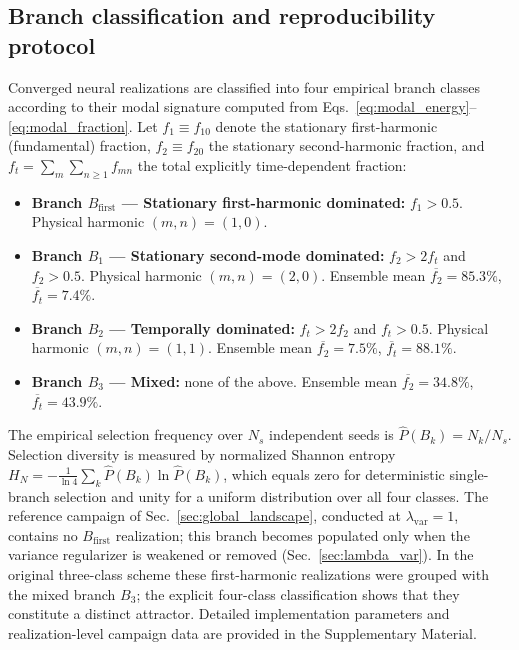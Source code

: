 \documentclass[a4paper,11pt]{article}
\begin{document}
\subsection{Branch classification and reproducibility protocol}

Converged neural realizations are classified into four empirical branch classes
according to their modal signature computed from
Eqs.~\eqref{eq:modal_energy}--\eqref{eq:modal_fraction}. Let
\(f_1\equiv f_{10}\) denote the stationary first-harmonic (fundamental) fraction,
\(f_2\equiv f_{20}\) the stationary second-harmonic fraction, and
\(f_t=\sum_m\sum_{n\ge1}f_{mn}\) the total explicitly time-dependent fraction:
\begin{itemize}
\item \textbf{Branch \(B_{\mathrm{first}}\) --- Stationary first-harmonic dominated:}
\(f_1>0.5\). Physical harmonic \((m,n)=(1,0)\).
\item \textbf{Branch \(B_1\) --- Stationary second-mode dominated:}
\(f_2>2f_t\) and \(f_2>0.5\).
Physical harmonic \((m,n)=(2,0)\). Ensemble mean \(\overline{f_2}=85.3\%\),
\(\overline{f_t}=7.4\%\).
\item \textbf{Branch \(B_2\) --- Temporally dominated:} \(f_t>2f_2\) and \(f_t>0.5\).
Physical harmonic \((m,n)=(1,1)\). Ensemble mean \(\overline{f_2}=7.5\%\),
\(\overline{f_t}=88.1\%\).
\item \textbf{Branch \(B_3\) --- Mixed:} none of the above.
Ensemble mean \(\overline{f_2}=34.8\%\), \(\overline{f_t}=43.9\%\).
\end{itemize}
The empirical selection frequency over \(N_s\) independent seeds is
\(\widehat P(B_k)=N_k/N_s\). Selection diversity is measured by normalized Shannon
entropy \(H_N=-\frac{1}{\ln 4}\sum_k\widehat P(B_k)\ln\widehat P(B_k)\), which
equals zero for deterministic single-branch selection and unity for a uniform
distribution over all four classes. The reference campaign of
Sec.~\ref{sec:global_landscape}, conducted at \(\lambda_{\mathrm{var}}=1\), contains
no \(B_{\mathrm{first}}\) realization; this branch becomes populated only when the
variance regularizer is weakened or removed (Sec.~\ref{sec:lambda_var}). In the
original three-class scheme these first-harmonic realizations were grouped with the
mixed branch \(B_3\); the explicit four-class classification shows that they
constitute a distinct attractor. Detailed implementation parameters and
realization-level campaign data are provided in the Supplementary Material.

\end{document}
